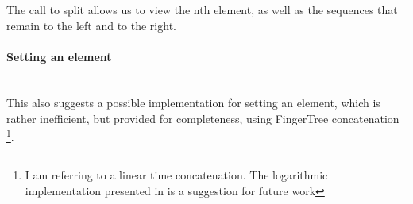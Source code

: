 \documentclass[12pt,twoside,notitlepage]{report}
\begin{document}
\begin{code}
\>[0]\<[4]%
\>[4]\AgdaFunction{\_!\_} \AgdaSymbol{:}  \AgdaSymbol{\{}\AgdaSymbol{\}\{} \AgdaSymbol{:}  \AgdaSymbol{\}\{} \AgdaSymbol{:} \AgdaSymbol{\}}         \<%
\\
\>[0]\<[4]%
\>[4] \AgdaFunction{!}       \AgdaSymbol{(} \AgdaSymbol{)}  \AgdaSymbol{)} \AgdaSymbol{(} \AgdaSymbol{)} \<%
\\
\>[0]\<[4]%
\>[4] \AgdaFunction{!}  \AgdaSymbol{|}  \AgdaSymbol{(} \AgdaSymbol{\_}  \AgdaSymbol{\_)} \AgdaSymbol{=}  \AgdaSymbol{(} \AgdaSymbol{)}\<%
\\
\>[0]\<[4]%
\>[4] \AgdaFunction{!}  \AgdaSymbol{|}  \AgdaSymbol{=} \<%
\\
\end{code}

The call to split allows us to view the nth element, as well as the sequences that remain to the left and to the right.

\paragraph{Setting an element} \mbox{} \\
This also suggests a possible implementation for setting an element, which is rather inefficient, but provided for completeness, using FingerTree concatenation \footnote{I am referring to a linear time concatenation. The logarithmic implementation presented in \cite{fingertrees} is a suggestion for future work}.
\end{document}
